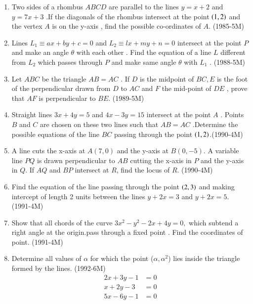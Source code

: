 \documentclass[journal,12pt,twocolumn]{IEEEtran}
\theoremstyle{remark}
\begin{document}
\begin{enumerate}[start=4]
\item Two sides of a rhombus $ABCD$ are parallel to the lines $y=x+2$ and $y=7x+3$ .If the diagonals of the rhombus intersect at the point $\left(1,2\right)$ and the vertex $A$ is on the y-axis , find the possible co-ordinates of $A$.     \hfill{(1985-5M)} 

\item Lines $ L_1 \equiv ax+by+c =0 $ and $ L_2 \equiv lx+my+n =0 $ intersect at the point $P$ and make an angle $\theta$ with each other . Find the equation of a line $L$ different from $L_2$ which passes through $P$ and make same angle $\theta$ with $L_1$ . \hfill{(1988-5M)}


\item Let $ABC$ be the triangle $AB=AC$ . If $D$ is the midpoint of $ BC , E$ is the foot of the perpendicular drawn from $D$ to $AC$ and $F$ the mid-point of $DE$ , prove that $AF$ is perpendicular to $BE.$ \hfill{(1989-5M)}

\item Straight lines $3x + 4y =5$ and $ 4x-3y= 15$ intersect at the point $A$ . Points $B$ and $C$ are chosen on these two lines such that $AB=AC$ .Determine the possible equations of the line $BC$ passing through the point $\left(1,2\right)$.\hfill{(1990-4M)}

\item A line cuts the x-axis at $A(7,0)$ and the y-axis at $B(0,-5)$. A variable line $PQ$ is drawn perpendicular to $AB$ cutting the x-axis in $P$ and the y-axis in $Q$. If $AQ$ and $BP$ intersect at $R$, find the locus of $R$.  \hfill{(1990-4M)}

\item Find the equation of the line passing through the point $\left(2,3\right)$ and making intercept of length 2 units between the lines $ y + 2x = 3 $ and $ y + 2x = 5  $.     \hfill{(1991-4M)}


\item Show that all chords of  the curve $ 3x^2-y^2-2x+4y=0,$ which subtend a right angle at the origin.pass through a fixed point . Find the coordinates of point.     \hfill{(1991-4M)}

\item Determine all values of $\alpha$ for which the point ($\alpha , \alpha^2$) lies inside the triangle formed by the lines.  \hfill{(1992-6M)}
	\begin{align*}  2x+3y-1&=0\\ 
	x+2y-3&=0  \\ 5x-6y-1&=0   \end{align*}

\end{enumerate}
\end{document}
